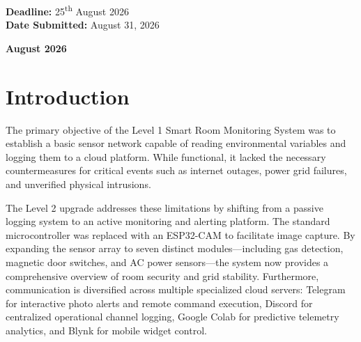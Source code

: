 \documentclass[12pt,a4paper]{article}
\begin{document}
\begin{titlepage}
    \vspace{-1.5cm}
    \begin{flushright}
        \textbf{Deadline:} 25\textsuperscript{th} August 2026 \\
        \textbf{Date Submitted:} August 31, 2026
    \end{flushright}
    
    \vspace{1cm}
    {\large \textbf{August 2026}}
\end{titlepage}

\newpage
\begin{abstract}
This report details the design and implementation of the Level 2 upgrade for the Smart Room Monitoring System. Building upon the baseline parameter logging established in Level 1, this upgrade introduces complex hardware integration for enhanced security, safety, and energy profiling. An ESP32-CAM microcontroller was utilized to capture visual evidence of intrusions, while a SIM800L GSM module was integrated to ensure redundant SMS and call alerts during network outages. Additionally, ZMPT101B and ACS712 sensors were deployed to monitor AC mains voltage and current, enabling blackout detection and power consumption tracking. Telemetry and alerting are orchestrated across a robust multi-server cloud ecosystem comprising ThingSpeak, Telegram Bot API, Discord Webhook notifications, Google Colab machine-learning telemetry analytics, and a Blynk IoT mobile dashboard. The resulting prototype successfully met all functional deliverables, operating autonomously to secure and monitor the room environment.
\end{abstract}

\newpage
\tableofcontents

\newpage
\setcounter{page}{1}

\section{Introduction}
The primary objective of the Level 1 Smart Room Monitoring System was to establish a basic sensor network capable of reading environmental variables and logging them to a cloud platform. While functional, it lacked the necessary countermeasures for critical events such as internet outages, power grid failures, and unverified physical intrusions.

The Level 2 upgrade addresses these limitations by shifting from a passive logging system to an active monitoring and alerting platform. The standard microcontroller was replaced with an ESP32-CAM to facilitate image capture. By expanding the sensor array to seven distinct modules—including gas detection, magnetic door switches, and AC power sensors—the system now provides a comprehensive overview of room security and grid stability. Furthermore, communication is diversified across multiple specialized cloud servers: Telegram for interactive photo alerts and remote command execution, Discord for centralized operational channel logging, Google Colab for predictive telemetry analytics, and Blynk for mobile widget control.
\end{document}
